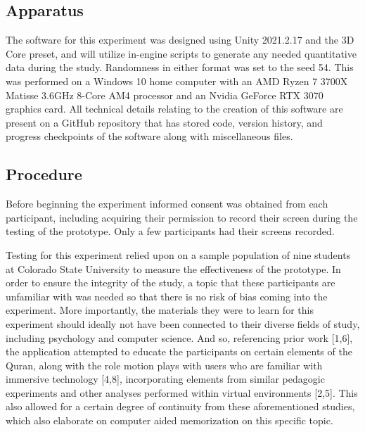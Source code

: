 \documentclass{vgtc}                          %
\begin{document}
\subsection{Apparatus}

The software for this experiment was designed using Unity 2021.2.17 and the 3D Core preset, and will utilize in-engine scripts to generate any needed quantitative data during the study. Randomness in either format was set to the seed 54. This was performed on a Windows 10 home computer with an AMD Ryzen 7 3700X Matisse 3.6GHz 8-Core AM4 processor and an Nvidia GeForce RTX 3070 graphics card. All technical details relating to the creation of this software are present on a GitHub repository that has stored code, version history, and progress checkpoints of the software along with miscellaneous files.

\subsection{Procedure}

Before beginning the experiment informed consent was obtained from each participant, including acquiring their permission to record their screen during the testing of the prototype. Only a few participants had their screens recorded.

Testing for this experiment relied upon on a sample population of nine students at Colorado State University to measure the effectiveness of the prototype. In order to ensure the integrity of the study, a topic that these participants are unfamiliar with was needed so that there is no risk of bias coming into the experiment. More importantly, the materials they were to learn for this experiment should ideally not have been connected to their diverse fields of study, including psychology and computer science. And so, referencing prior work [1,6], the application attempted to educate the participants on certain elements of the Quran, along with the role motion plays with users who are familiar with immersive technology [4,8], incorporating elements from similar pedagogic experiments and other analyses performed within virtual environments [2,5]. This also allowed for a certain degree of continuity from these aforementioned studies, which also elaborate on computer aided memorization on this specific topic.
\end{document}

